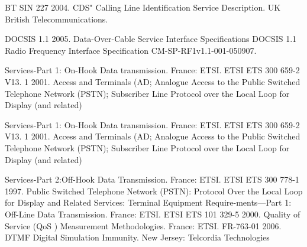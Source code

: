 \begin{thebibliography}{1}

BT SIN 227 2004. CDS" Calling Line Identification Service Description. UK British
Telecommunications.

DOCSIS 1.1 2005. Data-Over-Cable Service Interface Specifications DOCSIS 1.1
Radio Frequency Interface Specification CM-SP-RF1v1.1-001-050907.

Services-Part 1: On-Hook Data transmission. France: ETSI. ETSI ETS 300 659-2 V13.
1 2001. Access and Terminals (AD; Analogue Access to the Public Switched
Telephone Network (PSTN); Subscriber Line Protocol over the Local Loop for
Display (and related)

Services-Part 1: On-Hook Data transmission. France: ETSI. ETSI ETS 300 659-2 V13.
1 2001. Access and Terminals (AD; Analogue Access to the Public Switched
Telephone Network (PSTN); Subscriber Line Protocol over the Local Loop for
Display (and related)

Services-Part 2:Off-Hook Data Transmission. France: ETSI. ETSI ETS 300 778-1
1997. Public Switched Telephone Network (PSTN): Protocol Over the Local Loop for
Display and Related Services: Terminal Equipment Require-ments—Part 1: Off-Line
Data Transmission. France: ETSI. ETSI ETS 101 329-5 2000. Quality of Service (QoS
) Measurement Methodologies. France: ETSI. FR-763-01 2006. DTMF Digital
Simulation Immunity. New Jersey: Telcordia Technologies
                                                             
\end{thebibliography}
\newpage

